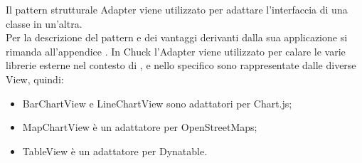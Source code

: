 	Il pattern strutturale Adapter viene utilizzato per adattare l'interfaccia di una classe in un'altra.\\
	Per la descrizione del pattern e dei vantaggi derivanti dalla sua applicazione si rimanda all'appendice .
	In Chuck l'Adapter viene utilizzato per calare le varie librerie esterne nel contesto di \projectname{}, e nello specifico sono rappresentate dalle diverse View, quindi:
	\begin{itemize}
	\item BarChartView e LineChartView sono adattatori per Chart.js;
	\item MapChartView è un adattatore per OpenStreetMaps;
	\item TableView è un adattatore per Dynatable.
	\end{itemize}
	
		
		
		
	
